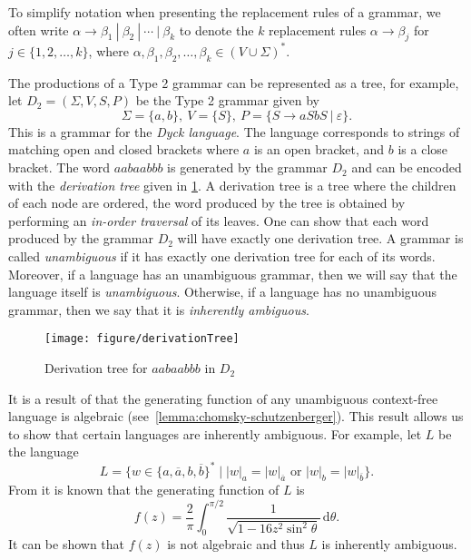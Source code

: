 \begin{notation}
To simplify notation when presenting the replacement rules of a grammar, we often write $\alpha \to \beta_1\ |\ \beta_2\ |\ \cdots\ |\ \beta_k$ to denote the $k$ replacement rules $\alpha \to \beta_j$ for $j \in \{1,2,\ldots,k\}$, where $\alpha,\beta_1,\beta_2,\ldots,\beta_k \in (V \cup \Sigma)^*$.
\end{notation}

The productions of a Type 2 grammar can be represented as a tree, for example, let $D_2 = (\Sigma, V, S, P)$ be the Type 2 grammar given by
\[
	\Sigma = \{a,b\},\ 
	V = \{S\},\ 
	P=
	\{
		S \to aSbS\ |\ \varepsilon
	\}.
\]
This is a grammar for the \emph{Dyck language}.
The language corresponds to strings of matching open and closed brackets where $a$ is an open bracket, and $b$ is a close bracket.
The word $aabaabbb$ is generated by the grammar $D_2$ and  can be encoded with the \emph{derivation tree} given in \cref{fig:dyck-language}.
A derivation tree is a tree where the children of each node are ordered, the word produced by the tree is obtained by performing an \emph{in-order traversal} of its leaves.
One can show that each word produced by the grammar $D_2$ will have exactly one derivation tree.
A grammar is called \emph{unambiguous} if it has exactly one derivation tree for each of its words.
Moreover, if a language has an unambiguous grammar, then we will say that the language itself is \emph{unambiguous}.
Otherwise, if a language has no unambiguous grammar, then we say that it is \emph{inherently ambiguous}.

\begin{figure}[!ht]
	\centering
	\texttt{[image: figure/derivationTree]}
	\caption{Derivation tree for $aabaabbb$ in $D_2$}%
	\label{fig:dyck-language}
\end{figure}

It is a result of \citeauthor{chomsky1963} that the generating function of any unambiguous context-free language is algebraic (see~\cref{lemma:chomsky-schutzenberger}).
This result allows us to show that certain languages are inherently ambiguous.
For example, let $L$ be the language
\[
	L
	=
	\{
		w \in \{a, \overline{a}, b, \overline{b}\}^*
	\mid
		|w|_{a} = |w|_{\overline{a}}
		\text{ or }
		|w|_{b} = |w|_{\overline{b}}
	\}.
\]
From \cite[296]{flajolet1987} it is known that the generating function of $L$ is
\[
	f(z)
	=
	\frac{2}{\pi}
	\int_{0}^{\pi/2}
		\frac{1}{
			\sqrt{1-16z^2 \sin^2\theta}} \,\mathrm{d} \theta.
\]
It can be shown that $f(z)$ is not algebraic and thus $L$ is inherently ambiguous.

